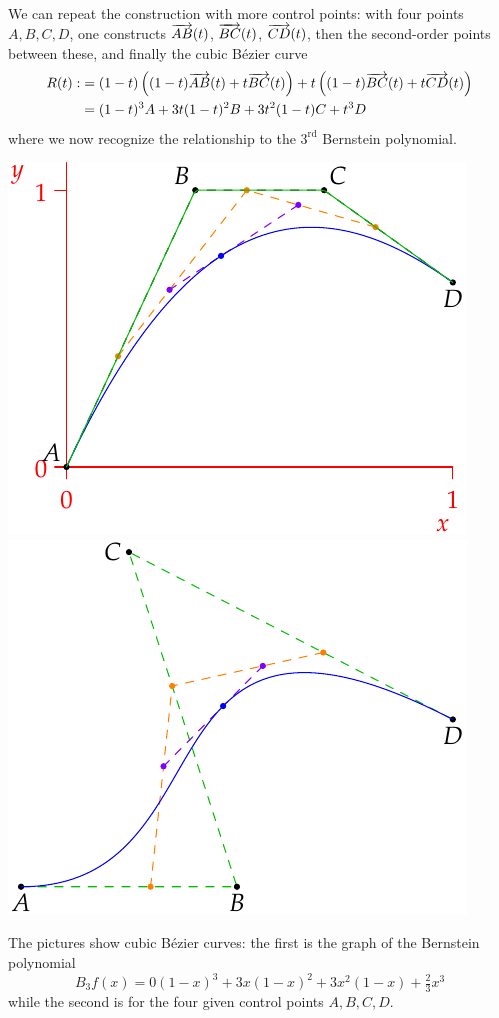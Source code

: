We can repeat the construction with more control points: with four points $A,B,C,D$, one constructs $\overrightarrow{AB}(t)$, $\overrightarrow{BC}(t)$, $\overrightarrow{CD}(t)$, then the second-order points between these, and finally the cubic Bézier curve
\begin{align*}
R(t):&=(1-t)\left((1-t)\overrightarrow{AB}(t)+t\overrightarrow{BC}(t)\right) +t\left((1-t)\overrightarrow{BC}(t)+t\overrightarrow{CD}(t)\right)\\
&=(1-t)^3A+3t(1-t)^2B+3t^2(1-t)C+t^3D
\end{align*}
where we now recognize the relationship to the $3^\text{rd}$ Bernstein polynomial. 
\begin{center}
\includegraphics{bezier-cubic2}
\hfill
\includegraphics{bezier-cubicalt2}
\end{center}
The pictures show cubic Bézier curves: the first is the graph of the Bernstein polynomial
\[B_3f(x)=0(1-x)^3+3x(1-x)^2+3x^2(1-x)+\tfrac 23x^3\]
while the second is for the four given control points $A,B,C,D$.

